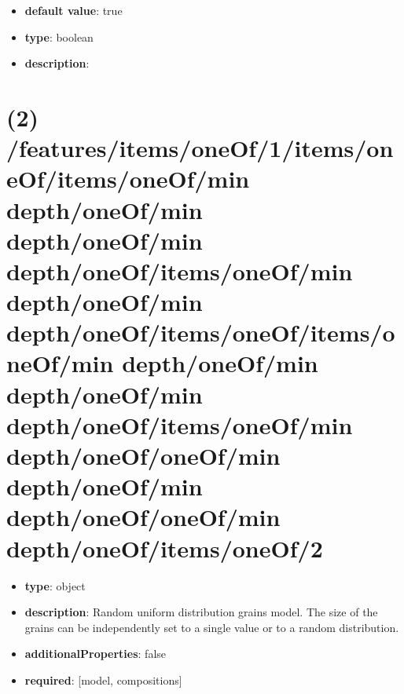 \begin{itemize}[leftmargin=4em]\item {\bf default value}: true
\item {\bf type}: boolean
\item {\bf description}: 
\end{itemize}\section{(2) /features/items/oneOf/1/items/oneOf/items/oneOf/min depth/oneOf/min depth/oneOf/min depth/oneOf/items/oneOf/min depth/oneOf/min depth/oneOf/items/oneOf/items/oneOf/min depth/oneOf/min depth/oneOf/min depth/oneOf/items/oneOf/min depth/oneOf/oneOf/min depth/oneOf/min depth/oneOf/oneOf/min depth/oneOf/items/oneOf/2}
\begin{itemize}[leftmargin=2em]\item {\bf type}: object
\item {\bf description}: Random uniform distribution grains model. The size of the grains can be independently set to a single value or to a random distribution.
\item {\bf additionalProperties}: false
\item {\bf required}: [model, compositions]\end{itemize}
